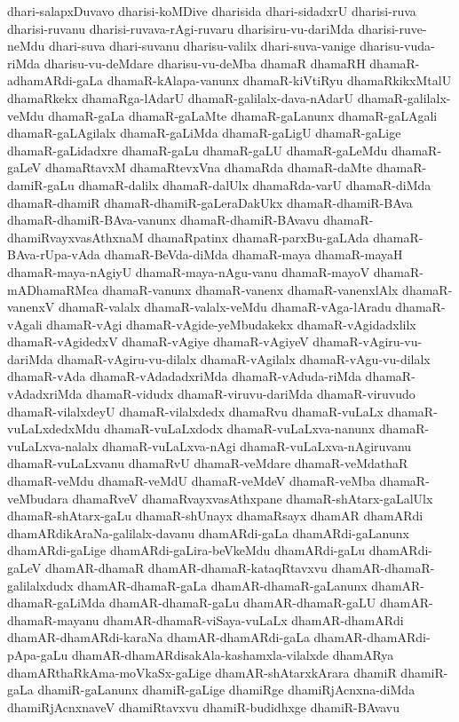 {dhari-salapxDuvavo
dharisi-koMDive
dharisida
dhari-sidadxrU
dharisi-ruva
dharisi-ruvanu
dharisi-ruvava-rAgi-ruvaru
dharisiru-vu-dariMda
dharisi-ruve-neMdu
dhari-suva
dhari-suvanu
dharisu-valilx
dhari-suva-vanige
dharisu-vuda-riMda
dharisu-vu-deMdare
dharisu-vu-deMba
dhamaR
dhamaRH
dhamaR-adhamARdi-gaLa
dhamaR-kAlapa-vanunx
dhamaR-kiVtiRyu
dhamaRkikxMtalU
dhamaRkekx
dhamaRga-lAdarU
dhamaR-galilalx-dava-nAdarU
dhamaR-galilalx-veMdu
dhamaR-gaLa
dhamaR-gaLaMte
dhamaR-gaLanunx
dhamaR-gaLAgali
dhamaR-gaLAgilalx
dhamaR-gaLiMda
dhamaR-gaLigU
dhamaR-gaLige
dhamaR-gaLidadxre
dhamaR-gaLu
dhamaR-gaLU
dhamaR-gaLeMdu
dhamaR-gaLeV
dhamaRtavxM
dhamaRtevxVna
dhamaRda
dhamaR-daMte
dhamaR-damiR-gaLu
dhamaR-dalilx
dhamaR-dalUlx
dhamaRda-varU
dhamaR-diMda
dhamaR-dhamiR
dhamaR-dhamiR-gaLeraDakUkx
dhamaR-dhamiR-BAva
dhamaR-dhamiR-BAva-vanunx
dhamaR-dhamiR-BAvavu
dhamaR-dhamiRvayxvasAthxnaM
dhamaRpatinx
dhamaR-parxBu-gaLAda
dhamaR-BAva-rUpa-vAda
dhamaR-BeVda-diMda
dhamaR-maya
dhamaR-mayaH
dhamaR-maya-nAgiyU
dhamaR-maya-nAgu-vanu
dhamaR-mayoV
dhamaR-mADhamaRMca
dhamaR-vanunx
dhamaR-vanenx
dhamaR-vanenxlAlx
dhamaR-vanenxV
dhamaR-valalx
dhamaR-valalx-veMdu
dhamaR-vAga-lAradu
dhamaR-vAgali
dhamaR-vAgi
dhamaR-vAgide-yeMbudakekx
dhamaR-vAgidadxlilx
dhamaR-vAgidedxV
dhamaR-vAgiye
dhamaR-vAgiyeV
dhamaR-vAgiru-vu-dariMda
dhamaR-vAgiru-vu-dilalx
dhamaR-vAgilalx
dhamaR-vAgu-vu-dilalx
dhamaR-vAda
dhamaR-vAdadadxriMda
dhamaR-vAduda-riMda
dhamaR-vAdadxriMda
dhamaR-vidudx
dhamaR-viruvu-dariMda
dhamaR-viruvudo
dhamaR-vilalxdeyU
dhamaR-vilalxdedx
dhamaRvu
dhamaR-vuLaLx
dhamaR-vuLaLxdedxMdu
dhamaR-vuLaLxdodx
dhamaR-vuLaLxva-nanunx
dhamaR-vuLaLxva-nalalx
dhamaR-vuLaLxva-nAgi
dhamaR-vuLaLxva-nAgiruvanu
dhamaR-vuLaLxvanu
dhamaRvU
dhamaR-veMdare
dhamaR-veMdathaR
dhamaR-veMdu
dhamaR-veMdU
dhamaR-veMdeV
dhamaR-veMba
dhamaR-veMbudara
dhamaRveV
dhamaRvayxvasAthxpane
dhamaR-shAtarx-gaLalUlx
dhamaR-shAtarx-gaLu
dhamaR-shUnayx
dhamaRsayx
dhamAR
dhamARdi
dhamARdikAraNa-galilalx-davanu
dhamARdi-gaLa
dhamARdi-gaLanunx
dhamARdi-gaLige
dhamARdi-gaLira-beVkeMdu
dhamARdi-gaLu
dhamARdi-gaLeV
dhamAR-dhamaR
dhamAR-dhamaR-kataqRtavxvu
dhamAR-dhamaR-galilalxdudx
dhamAR-dhamaR-gaLa
dhamAR-dhamaR-gaLanunx
dhamAR-dhamaR-gaLiMda
dhamAR-dhamaR-gaLu
dhamAR-dhamaR-gaLU
dhamAR-dhamaR-mayanu
dhamAR-dhamaR-viSaya-vuLaLx
dhamAR-dhamARdi
dhamAR-dhamARdi-karaNa
dhamAR-dhamARdi-gaLa
dhamAR-dhamARdi-pApa-gaLu
dhamAR-dhamARdisakAla-kashamxla-vilalxde
dhamARya
dhamARthaRkAma-moVkaSx-gaLige
dhamAR-shAtarxkArara
dhamiR
dhamiR-gaLa
dhamiR-gaLanunx
dhamiR-gaLige
dhamiRge
dhamiRjAcnxna-diMda
dhamiRjAcnxnaveV
dhamiRtavxvu
dhamiR-budidhxge
dhamiR-BAvavu
}
